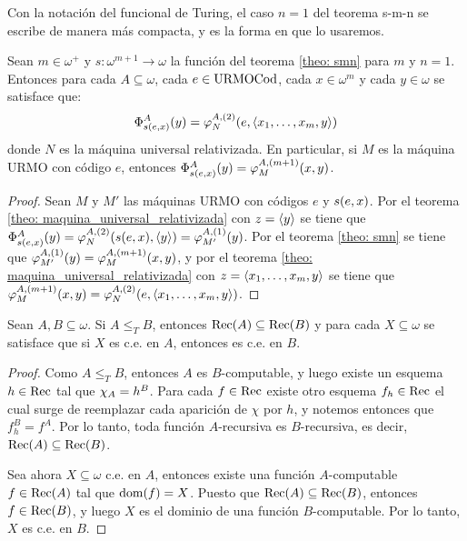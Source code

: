 \begin{agregado}
\begin{agregado}
\begin{correccion}
Con la notación del funcional de Turing, el caso $n = 1$ del teorema s-m-n se escribe de manera más compacta, y es la forma en que lo usaremos.

\begin{coll}
	\label{coll: smn_phi}
	Sean $m\in\omega^{+}$ y $s:\omega^{m + 1}\to\omega$ la función del teorema \ref{theo: smn} para $m$ y $n = 1$. Entonces para cada $A\subseteq\omega$, cada $e\in\URMOCODIGO$, cada $x\in\omega^{m}$ y cada $y\in\omega$ se satisface que:
	\[
		\Phi_{s\pa*{e, x}}^{A}\pa*{y} =\varphi_{N}^{A, (2)}\pa*{e,\inner*{x_{1},\dotsc, x_{m}, y}}
	\]
	donde $N$ es la máquina universal relativizada. En particular, si $M$ es la máquina URMO con código $e$, entonces $\Phi_{s\pa*{e, x}}^{A}\pa*{y} =\varphi_{M}^{A, (m + 1)}\pa*{x, y}$.
\end{coll}

\begin{proof}
	Sean $M$ y $M'$ las máquinas URMO con códigos $e$ y $s\pa*{e, x}$. Por el teorema \ref{theo: maquina_universal_relativizada} con $z =\inner*{y}$ se tiene que $\Phi_{s\pa*{e, x}}^{A}\pa*{y} =\varphi_{N}^{A, (2)}\pa*{s\pa*{e, x},\inner*{y}} =\varphi_{M'}^{A, (1)}\pa*{y}$. Por el teorema \ref{theo: smn} se tiene que $\varphi_{M'}^{A, (1)}\pa*{y} =\varphi_{M}^{A, (m + 1)}\pa*{x, y}$, y por el teorema \ref{theo: maquina_universal_relativizada} con $z =\inner*{x_{1},\dotsc, x_{m}, y}$ se tiene que $\varphi_{M}^{A, (m + 1)}\pa*{x, y} =\varphi_{N}^{A, (2)}\pa*{e,\inner*{x_{1},\dotsc, x_{m}, y}}$.
\end{proof}
\end{correccion}

\begin{lemma}
	\label{lemma: transferencia}
	Sean $A, B\subseteq\omega$. Si $A\leq_{T} B$, entonces $\RECURSIVO\pa*{A}\subseteq\RECURSIVO\pa*{B}$ y para cada $X\subseteq\omega$ se satisface que si $X$ es c.e. en $A$, entonces es c.e. en $B$.
\end{lemma}

\begin{proof}
	Como $A\leq_{T} B$, entonces $A$ es $B$-computable, y luego existe un esquema $h\in\RECURSIVO$ tal que $\CARACTERISTICA{A} = h^{B}$. Para cada $f\in\RECURSIVO$ existe otro esquema $f_{h}\in\RECURSIVO$ el cual surge de reemplazar cada aparición de $\chi$ por $h$, y notemos entonces que $f_{h}^{B} = f^{A}$. Por lo tanto, toda función $A$-recursiva es $B$-recursiva, es decir, $\RECURSIVO\pa*{A}\subseteq\RECURSIVO\pa*{B}$.

	Sea ahora $X\subseteq\omega$ c.e. en $A$, entonces existe una función $A$-computable $f\in\RECURSIVO\pa*{A}$ tal que $\DOMINIO{f} = X$. Puesto que $\RECURSIVO\pa*{A}\subseteq\RECURSIVO\pa*{B}$, entonces $f\in\RECURSIVO\pa*{B}$, y luego $X$ es el dominio de una función $B$-computable. Por lo tanto, $X$ es c.e. en $B$.
\end{proof}


\end{agregado}
\end{agregado}
